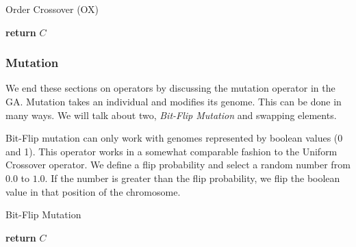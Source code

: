 \begin{algorithm}[H]
    \caption{Order Crossover (OX)}
    \label{theory-ga-ox}
    \begin{algorithmic}[1]
         
             
            \EndIf
             
             
                 
                \EndWhile
                 
                \EndIf
            \EndFor
            \State \textbf{return} $C$
        \EndProcedure
    \end{algorithmic}
\end{algorithm}


\subsubsection{Mutation}

We end these sections on operators by discussing the mutation operator in the GA. Mutation takes an individual and modifies its genome. This can be done in many ways. We will talk about two, \textit{Bit-Flip Mutation} and swapping elements.

Bit-Flip mutation can only work with genomes represented by boolean values (0 and 1). This operator works in a somewhat comparable fashion to the Uniform Crossover operator. We define a flip probability and select a random number from $0.0$ to $1.0$. If the number is greater than the flip probability, we flip the boolean value in that position of the chromosome.

\begin{algorithm}[H]
    \caption{Bit-Flip Mutation}
    \begin{algorithmic}[1]
                \EndIf
            \EndFor
            \State \textbf{return} $C$
        \EndProcedure
    \end{algorithmic}
\end{algorithm}

